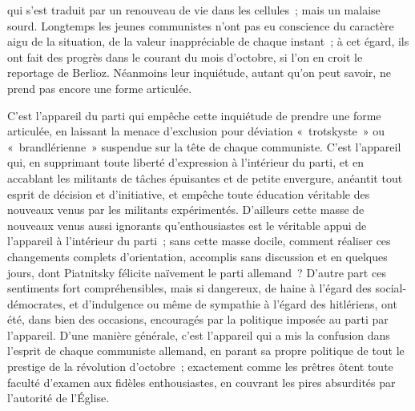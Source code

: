 \documentclass[french,twoside]{book} %
\begin{document}
qui s'est traduit par un renouveau de vie dans les cellules ; mais un malaise sourd. Longtemps les jeunes communistes n'ont pas eu conscience du caractère aigu de la situation, de la valeur inappréciable de chaque instant ; à cet égard, ils ont fait des progrès dans le courant du mois d'octobre, si l'on en croit le reportage de Berlioz. Néanmoins leur inquiétude, autant qu'on peut savoir, ne prend pas encore une forme articulée.\par
C'est l'appareil du parti qui empêche cette inquiétude de prendre une forme articulée, en laissant la menace d'exclusion pour déviation « trotskyste » ou « brandlérienne » suspendue sur la tête de chaque communiste. C'est l'appareil qui, en supprimant toute liberté d'expression à l'intérieur du parti, et en accablant les militants de tâches épuisantes et de petite envergure, anéantit tout esprit de décision et d'initiative, et empêche toute éducation véritable des nouveaux venus par les militants expérimentés. D'ailleurs cette masse de nouveaux venus aussi ignorants qu'enthousiastes est le véritable appui de l'appareil à l'intérieur du parti ; sans cette masse docile, comment réaliser ces changements complets d'orientation, accomplis sans discussion et en quelques jours, dont Piatnitsky félicite naïvement le parti allemand ? D'autre part ces sentiments fort compréhensibles, mais si dangereux, de haine à l'égard des social-démocrates, et d'indulgence ou même de sympathie à l'égard des hitlé­riens, ont été, dans bien des occasions, encouragés par la politique imposée au parti par l'appareil. D'une manière générale, c'est l'appareil qui a mis la confusion dans l'esprit de chaque communiste allemand, en parant sa propre politique de tout le prestige de la révolution d'octobre ; exactement comme les prêtres ôtent toute faculté d'examen aux fidèles enthousiastes, en couvrant les pires absurdités par l'autorité de l'Église.\par
\end{document}
